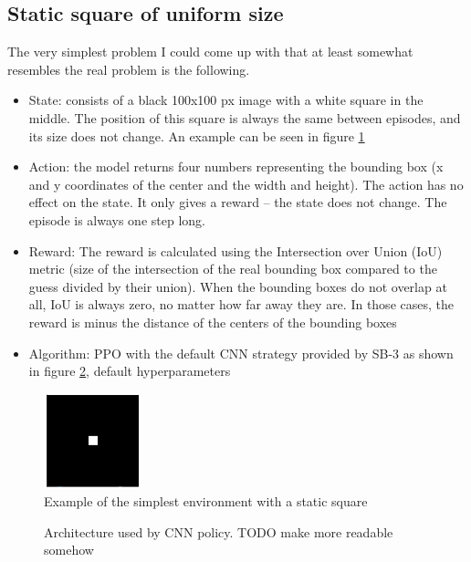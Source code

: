\documentclass[
  digital,     %
  oneside,     %
  nosansbold,  %
  nocolorbold, %
  lof,         %
  lot,         %
]{fithesis4}
\begin{document}
\subsection{Static square of uniform size}
The very simplest problem I could come up with that at least somewhat resembles the real problem is the following.
\begin{itemize}
    \item State: consists of a black 100x100 px image with a white square in the middle. The position of this square is always the same between episodes, and its size does not change. An example can be seen in figure \ref{fig:env0}
    \item Action: the model returns four numbers representing the bounding box (x and y coordinates of the center and the width and height). The action has no effect on the state. It only gives a reward -- the state does not change. The episode is always one step long.
    \item Reward: The reward is calculated using the Intersection over Union (IoU) metric (size of the intersection of the real bounding box compared to the guess divided by their union). When the bounding boxes do not overlap at all, IoU is always zero, no matter how far away they are. In those cases, the reward is minus the distance of the centers of the bounding boxes
    \item Algorithm: PPO with the default CNN strategy provided by SB-3 as shown in figure \ref{fig:cnn_policy}, default hyperparameters
\end{itemize}

\begin{figure}
    \includegraphics[width=0.5\linewidth]{env_examples/env0.png}
    \caption{Example of the simplest environment with a static square}
    \label{fig:env0}
\end{figure}

\begin{figure}
    \caption{Architecture used by CNN policy. TODO make more readable somehow}
    \label{fig:cnn_policy}
\end{figure}
\end{document}
